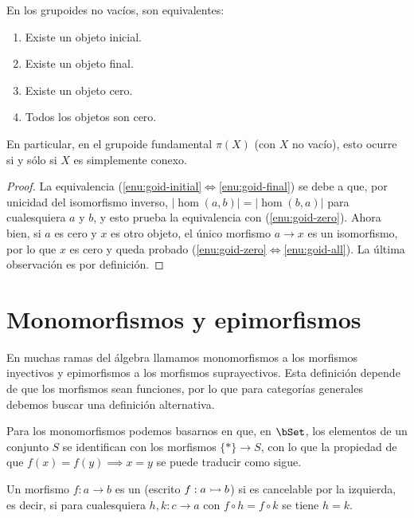 \begin{corollary}
  En los grupoides no vacíos, son equivalentes:
  \begin{enumerate}
  \item \label{enu:goid-initial} Existe un objeto inicial.
  \item \label{enu:goid-final} Existe un objeto final.
  \item \label{enu:goid-zero} Existe un objeto cero.
  \item \label{enu:goid-all} Todos los objetos son cero.
  \end{enumerate}
  En particular, en el grupoide fundamental $\pi(X)$ (con $X$ no vacío), esto
  ocurre si y sólo si $X$ es simplemente conexo.
\end{corollary}
\begin{proof}
  La equivalencia (\ref{enu:goid-initial}$\iff$\ref{enu:goid-final}) se debe a
  que, por unicidad del isomorfismo inverso, $|\hom(a,b)|=|\hom(b,a)|$ para
  cualesquiera $a$ y $b$, y esto prueba la equivalencia con
  (\ref{enu:goid-zero}). Ahora bien, si $a$ es cero y $x$ es otro objeto, el
  único morfismo $a\to x$ es un isomorfismo, por lo que $x$ es cero y queda
  probado (\ref{enu:goid-zero}$\iff$\ref{enu:goid-all}).  La última observación
  es por definición.
\end{proof}

\section{Monomorfismos y epimorfismos}

En muchas ramas del álgebra llamamos monomorfismos a los morfismos inyectivos y
epimorfismos a los morfismos suprayectivos. Esta definición depende de que los
morfismos sean funciones, por lo que para categorías generales debemos buscar
una definición alternativa.

Para los monomorfismos podemos basarnos en que, en $\bSet$, los elementos de un
conjunto $S$ se identifican con los morfismos $\{*\}\to S$, con lo que la
propiedad de que $f(x)=f(y)\implies x=y$ se puede traducir como sigue.

\begin{definition}
  Un morfismo $f:a\to b$ es un  (escrito $f:a\rightarrowtail b$) si
  es cancelable por la izquierda, es decir, si para cualesquiera $h,k:c\to a$
  con $f\circ h=f\circ k$ se tiene $h=k$.
\end{definition}

